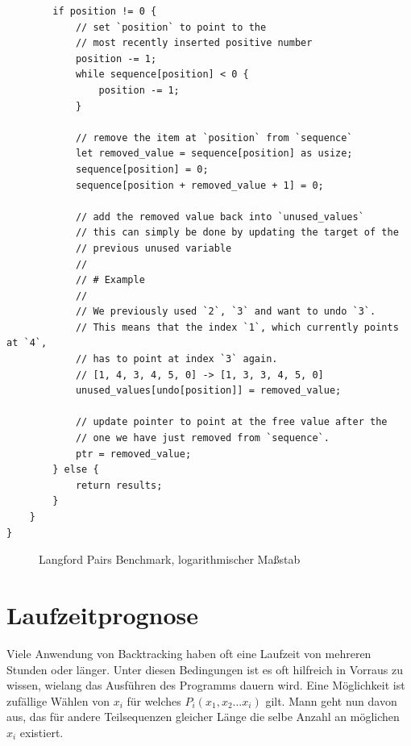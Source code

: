 \begin{verbatim}
        if position != 0 {
            // set `position` to point to the
            // most recently inserted positive number
            position -= 1;
            while sequence[position] < 0 {
                position -= 1;
            }

            // remove the item at `position` from `sequence`
            let removed_value = sequence[position] as usize;
            sequence[position] = 0;
            sequence[position + removed_value + 1] = 0;

            // add the removed value back into `unused_values`
            // this can simply be done by updating the target of the
            // previous unused variable
            //
            // # Example
            //
            // We previously used `2`, `3` and want to undo `3`.
            // This means that the index `1`, which currently points at `4`,
            // has to point at index `3` again.
            // [1, 4, 3, 4, 5, 0] -> [1, 3, 3, 4, 5, 0]
            unused_values[undo[position]] = removed_value;

            // update pointer to point at the free value after the 
            // one we have just removed from `sequence`.
            ptr = removed_value;
        } else {
            return results;
        }
    }
}
\end{verbatim}
\begin{figure}
  \centering
  
  \caption{Langford Pairs Benchmark, logarithmischer Maßstab }
\end{figure}
\chapter{Laufzeitprognose}

Viele Anwendung von Backtracking haben oft eine Laufzeit von mehreren Stunden oder länger.
Unter diesen Bedingungen ist es oft hilfreich in Vorraus zu wissen, wielang das Ausführen
des Programms dauern wird. Eine Möglichkeit ist zufällige Wählen von $x_{i}$ für welches
$P_{i}(x_{1}, x_{2} \dots x_{i})$ gilt. Mann geht nun davon aus,
das für andere Teilsequenzen gleicher Länge die selbe Anzahl an möglichen $x_{i}$ existiert.

